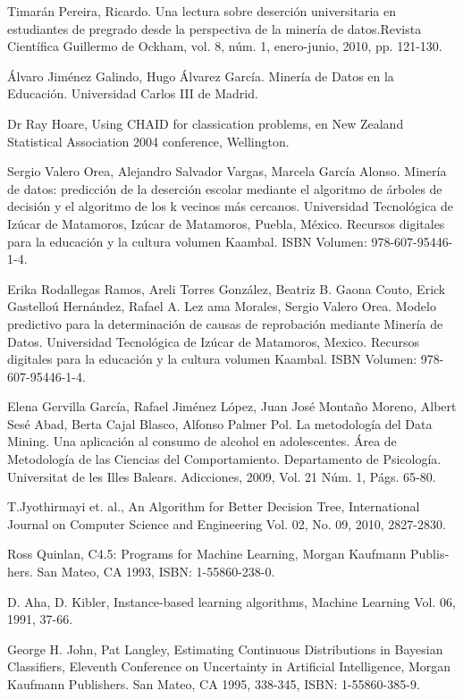 \begin{thebibliography}{Referencias}
Timarán Pereira, Ricardo. Una lectura sobre deserción
universitaria en estudiantes de pregrado desde la perspectiva de la
minería de datos.Revista Científica Guillermo de Ockham, vol. 8, núm.
1, enero-junio, 2010, pp. 121-130.

Álvaro Jiménez Galindo, Hugo Álvarez García. Minería
de Datos en la Educación. Universidad Carlos III de Madrid.

Dr Ray Hoare, Using CHAID for classication problems,
en New Zealand Statistical Association 2004 conference, Wellington.

Sergio Valero Orea, Alejandro Salvador Vargas, Marcela
García Alonso. Minería de datos: predicción de la deserción escolar
mediante el algoritmo de árboles de decisión y el algoritmo de los
k vecinos más cercanos. Universidad Tecnológica de Izúcar de Matamoros,
Izúcar de Matamoros, Puebla, México. Recursos digitales para la educación
y la cultura volumen Kaambal. ISBN Volumen: 978-607-95446-1-4.

Erika Rodallegas Ramos, Areli Torres González, Beatriz
B. Gaona Couto, Erick Gastelloú Hernández, Rafael A. Lez ama Morales,
Sergio Valero Orea. Modelo predictivo para la determinación de causas
de reprobación mediante Minería de Datos. Universidad Tecnológica
de Izúcar de Matamoros, Mexico. Recursos digitales para la educación
y la cultura volumen Kaambal. ISBN Volumen: 978-607-95446-1-4.

Elena Gervilla García, Rafael Jiménez López, Juan
José Montaño Moreno, Albert Sesé Abad, Berta Cajal Blasco, Alfonso
Palmer Pol. La metodología del Data Mining. Una aplicación al consumo
de alcohol en adolescentes. Área de Metodología de las Ciencias del
Comportamiento. Departamento de Psicología. Universitat de les Illes
Balears. Adicciones, 2009, Vol. 21 Núm. 1, Págs. 65-80.

T.Jyothirmayi et. al., An Algorithm for Better Decision
Tree, International Journal on Computer Science and Engineering Vol.
02, No. 09, 2010, 2827-2830.

\foreignlanguage{spanish}{Ross Quinlan, C4.5: Programs for Machine Learning, Morgan Kaufmann Publishers. San Mateo, CA 1993, ISBN: 1-55860-238-0.}

D. Aha, D. Kibler, Instance-based learning algorithms, Machine Learning Vol.
06, 1991, 37-66.

George H. John, Pat Langley, Estimating Continuous Distributions in Bayesian Classifiers, Eleventh Conference on Uncertainty in Artificial Intelligence, Morgan Kaufmann Publishers. San Mateo, CA 1995, 338-345, ISBN: 1-55860-385-9.


\end{thebibliography}
